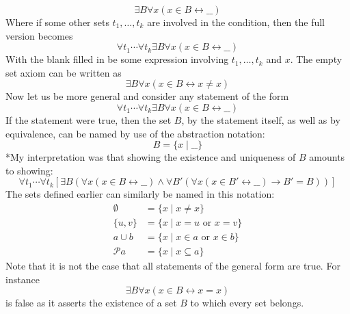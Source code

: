 \documentclass{report}
\begin{document}
\begin{equation*}
\exists B\forall x(x\in B\leftrightarrow \_\_)
\end{equation*}
Where if some other sets $t_1,\ldots,t_k$ are involved in the condition, then the full version becomes
\begin{equation*}
\forall t_1\cdots\forall t_k\exists B\forall x(x\in B\leftrightarrow\_\_)
\end{equation*}
With the blank filled in be some expression involving $t_1,\ldots,t_k$ and $x$. The empty set axiom can be written as
\begin{equation*}
\exists B\forall x(x\in B\leftrightarrow x\neq x)
\end{equation*}
Now let us be more general and consider any statement of the form
\begin{equation*}
\forall t_1\cdots\forall t_k\exists B\forall x(x\in B\leftrightarrow\_\_)
\end{equation*}
If the statement were true, then the set $B$, by the statement itself, as well as by equivalence, can be named by use of the abstraction notation:
\begin{equation*}
B=\{x\mid\_\_\}
\end{equation*}
*My interpretation was that showing the existence and uniqueness of $B$ amounts to showing:
\begin{equation*}
\forall t_1\cdots\forall t_k[\exists B(\forall x(x\in B\leftrightarrow\_\_)\land 
\forall B'(\forall x(x\in B'\leftrightarrow\_\_)\to B'=B))]
\end{equation*}
The sets defined earlier can similarly be named in this notation:
\begin{align*}
\emptyset&=\{x\mid x\neq x\}\\
\{u,v\}&=\{x\mid x=u\text{ or }x=v\}\\
a\cup b&=\{x\mid x\in a\text{ or }x\in b\}\\
\mathscr Pa&=\{x\mid x\subseteq a\}
\end{align*}
Note that it is not the case that all statements of the general form are true. For instance 
\begin{equation*}
\exists B\forall x(x\in B\leftrightarrow x=x)
\end{equation*}
is false as it asserts the existence of a set $B$ to which every set belongs.\newpage
\end{document}
